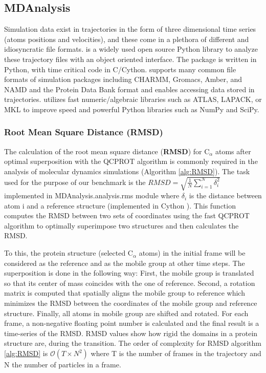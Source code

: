 \label{use_cases}

\subsection{MDAnalysis}
\label{sec:mda}

Simulation data exist in trajectories in the form of three dimensional time series (atoms positions and velocities), and these come in a plethora of different and idiosyncratic file formats. 
 is a widely used open source Python library to analyze these trajectory files with an object oriented interface. 
The package is written in Python, with time critical code in C/Cython. 
 supports many common file formats of simulation packages including CHARMM, Gromacs, Amber, and NAMD and the Protein Data Bank format and enables accessing data stored in trajectories. 
 utilizes fast numeric/algebraic libraries such as ATLAS, LAPACK, or MKL to improve speed and powerful Python libraries such as NumPy and SciPy.
 
\subsubsection{Root Mean Square Distance (RMSD)}
The calculation of the root mean square distance (\textbf{RMSD}) for C$_{\alpha}$ atoms after
optimal superposition with the QCPROT algorithm \cite{Liu:2010kx,Theobald:2005vn} is commonly required in the analysis of molecular dynamics simulations (Algorithm \ref{alg:RMSD}). 
The task used for the purpose of our benchmark is the $RMSD=\sqrt{\frac{1}{N}\sum_{i=1}^{N}\delta_{i}^{2}}$ implemented in MDAnalysis.analysis.rms module where $\delta_{i}$ is the distance between atom i and a reference structure (implemented in Cython \cite{Gowers:2016aa}).  
This function computes the RMSD between two sets of coordinates using the fast QCPROT algorithm to optimally superimpose two structures and then calculates the RMSD. 

To this, the protein structure (selected C$_{\alpha}$ atoms) in the initial frame will be considered as the reference and as the mobile group at other time steps. 
The superposition is done in the following way:
First, the mobile group is translated so that its center of mass coincides with the one of reference. 
Second, a rotation matrix is computed that spatially aligns the mobile group to reference which minimizes the RMSD between the coordinates of the mobile group and reference structure. 
Finally, all atoms in mobile group are shifted and rotated.
For each frame, a non-negative floating point number is calculated and the final result is a time-series of the RMSD. 
RMSD values show how rigid the domains in a protein structure are, during the transition. 
The order of complexity for RMSD algorithm \ref{alg:RMSD} is $\mathcal{O}(T \times N^{2})$ \cite{rmsd} where T is the number of frames in the trajectory and N the number of particles in a 
frame.

